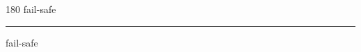 
\begin{frame}
\begin{center}
\begin{turn}{180}
{\fontsize{2.5cm}{1em}\selectfont fail-safe}
\end{turn}
\vspace{1em}\par  
\hrule
\vspace{1em}\par  
{\fontsize{2.5cm}{1em}\selectfont fail-safe}
\end{center}
\end{frame}
